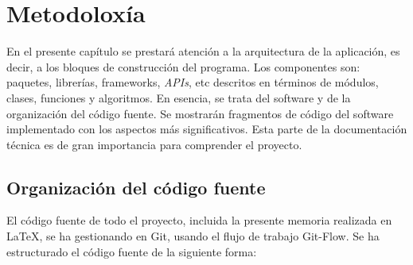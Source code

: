 \chapter[Metodoloxía]{
  \label{chp:metodoloxia}
  Metodoloxía
}
\minitoc
\newpage

En el presente capítulo se prestará atención a la arquitectura de la aplicación,
es decir, a los bloques de construcción del programa. Los componentes son:
paquetes, librerías, frameworks, \textit{APIs}, etc descritos en términos de
módulos, clases, funciones y algoritmos. En esencia, se trata del software y de
la organización del código fuente. Se mostrarán fragmentos de código del
software implementado con los aspectos más significativos. Esta parte de la
documentación técnica es de gran importancia para comprender el proyecto.


\section{Organización del código fuente}

El código fuente de todo el proyecto, incluida la presente memoria realizada en
\LaTeX, se ha gestionando en Git, usando el flujo de trabajo Git-Flow. Se ha
estructurado el código fuente de la siguiente forma:
